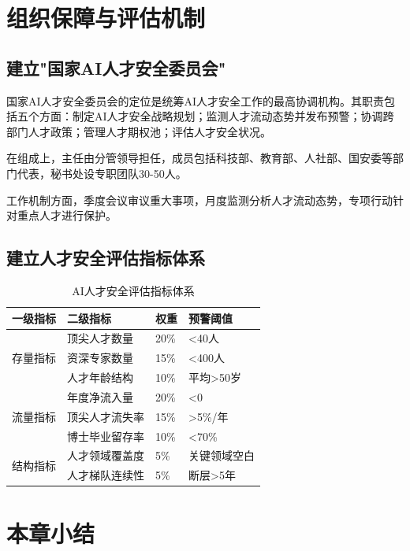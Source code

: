 \section{组织保障与评估机制}

\subsection{建立"国家AI人才安全委员会"}

国家AI人才安全委员会的定位是统筹AI人才安全工作的最高协调机构。其职责包括五个方面：制定AI人才安全战略规划；监测人才流动态势并发布预警；协调跨部门人才政策；管理人才期权池；评估人才安全状况。

在组成上，主任由分管领导担任，成员包括科技部、教育部、人社部、国安委等部门代表，秘书处设专职团队30-50人。

工作机制方面，季度会议审议重大事项，月度监测分析人才流动态势，专项行动针对重点人才进行保护。

\subsection{建立人才安全评估指标体系}

\begin{table}[H]
\centering
\caption{AI人才安全评估指标体系}
\small
\begin{tabular}{p{3cm}p{4cm}p{2cm}p{3cm}}
\toprule
\textbf{一级指标} & \textbf{二级指标} & \textbf{权重} & \textbf{预警阈值} \\
\midrule
\multirow{3}{*}{存量指标} & 顶尖人才数量 & 20\% & <40人 \\
 & 资深专家数量 & 15\% & <400人 \\
 & 人才年龄结构 & 10\% & 平均>50岁 \\
\midrule
\multirow{3}{*}{流量指标} & 年度净流入量 & 20\% & <0 \\
 & 顶尖人才流失率 & 15\% & >5\%/年 \\
 & 博士毕业留存率 & 10\% & <70\% \\
\midrule
\multirow{2}{*}{结构指标} & 人才领域覆盖度 & 5\% & 关键领域空白 \\
 & 人才梯队连续性 & 5\% & 断层>5年 \\
\bottomrule
\end{tabular}
\end{table}

\section{本章小结}

